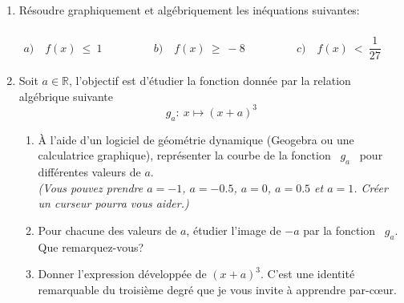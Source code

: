 \documentclass[a4paper,10pt]{article}
\newcommand{\R}{\mathbb{R}}
\begin{document}
\begin{enumerate}
\begin{enumerate}
		\end{enumerate}
		\item Résoudre graphiquement et  algébriquement les inéquations suivantes:\\\\
		$\begin{array}{lclcl}
		a)\quad f(x) \ \leq \ 1
		&\quad\quad\quad&b)\quad f(x) \ \geq \ -8&\quad\quad\quad&  
		c)\quad f(x) \ < \ \dfrac{1}{27}
		
		\end{array}$\\
		
	
	 
		\item Soit $a\in\R$, l'objectif est d'étudier la fonction donnée par la relation algébrique suivante \quad
		$$g_a:~x \longmapsto (x+a)^3$$
		\begin{enumerate}
			\item À l'aide d'un logiciel de géométrie dynamique (Geogebra ou une calculatrice graphique), représenter la courbe de la fonction ~$g_a$~ pour différentes valeurs de $a$.\\
			\textit{(Vous pouvez prendre $a=-1$, $a=-0.5$, $a=0$, $a=0.5$ et $a=1$. Créer un curseur pourra vous aider.)}\\
			\item Pour chacune des valeurs de $a$, étudier l'image de $-a$ par la fonction ~$g_a$. Que remarquez-vous?\\			
			\item Donner l'expression développée de $(x+a)^3$. C'est une identité remarquable du troisième degré que je vous invite à apprendre par-cœur. 
		\end{enumerate}
	\end{enumerate}	
	\newpage
	
\end{document}
